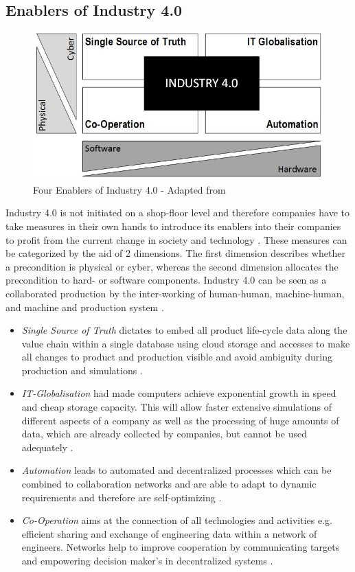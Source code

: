 \subsection{Enablers of Industry 4.0}
\begin{figure}[h!]
	\includegraphics[scale=0.6]{./gfx/indus4enablers}
	\centering
	\caption{Four Enablers of Industry 4.0 - Adapted from \cite{IN4HYPO}}
	\label{fig:2.1}
\end{figure}
Industry 4.0 is not initiated on a shop-floor level and therefore companies have to take measures in their own hands to introduce its enablers into their companies to profit from the current change in society and technology \cite{VDINACH}. 
These measures can be categorized by the aid of 2 dimensions. The first dimension describes whether a precondition is physical or cyber, whereas the second dimension allocates the precondition to hard- or software components. Industry 4.0 can be seen as a collaborated production by the inter-working of human-human, machine-human, and machine and production system  \cite{IN4HYPO}.
\begin{itemize}
	\item \textit{Single Source of Truth} dictates to embed all product life-cycle data along the value chain within a single database using cloud storage and accesses to make all changes to product and production visible and avoid ambiguity during production and simulations \cite{IN4HYPO}.
	\item \textit{IT-Globalisation} had made computers achieve exponential growth in speed and cheap storage capacity. This will allow faster extensive simulations of different aspects of a company as well as the processing of huge amounts of data, which are already collected by companies, but cannot be used adequately \cite{IN4HYPO}.
	\item \textit{Automation} leads to automated and decentralized processes which can be combined to collaboration networks and are able to adapt to dynamic requirements and therefore are self-optimizing \cite{IN4HYPO}.
	\item \textit{Co-Operation} aims at the connection of all technologies and activities e.g. efficient sharing and exchange of engineering data within a
	network of engineers. Networks help to improve cooperation by communicating targets and empowering decision maker’s in decentralized systems \cite{IN4HYPO,VDINACH}.
\end{itemize}
